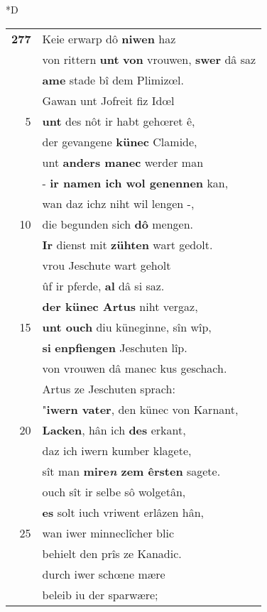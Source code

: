 \documentclass[8pt,a4paper,notitlepage]{article}
\begin{document}
\begin{table}[ht]
\begin{minipage}[t]{0.5\linewidth}
\small
\begin{center}*D
\end{center}
\begin{tabular}{rl}
\textbf{277} & Keie erwarp dô \textbf{niwen} haz\\ 
 & von rittern \textbf{unt} \textbf{von} vrouwen, \textbf{swer} dâ saz\\ 
 & \textbf{ame} stade bî dem Plimizœl.\\ 
 & Gawan unt Jofreit fiz Idœl\\ 
5 & \textbf{unt} des nôt ir habt gehœret ê,\\ 
 & der gevangene \textbf{künec} Clamide,\\ 
 & unt \textbf{anders manec} werder man\\ 
 & - \textbf{ir namen ich wol genennen} kan,\\ 
 & wan daz ichz niht wil lengen -,\\ 
10 & die begunden sich \textbf{dô} mengen.\\ 
 & \textbf{Ir} dienst mit \textbf{zühten} wart gedolt.\\ 
 & vrou Jeschute wart geholt\\ 
 & ûf ir pferde, \textbf{al} dâ si saz.\\ 
 & \textbf{der künec Artus} niht vergaz,\\ 
15 & \textbf{unt ouch} diu küneginne, sîn wîp,\\ 
 & \textbf{si} \textbf{enpfiengen} Jeschuten lîp.\\ 
 & von vrouwen dâ manec kus geschach.\\ 
 & Artus ze Jeschuten sprach:\\ 
 & "\textbf{iwern vater}, den künec von Karnant,\\ 
20 & \textbf{Lacken}, hân ich \textbf{des} erkant,\\ 
 & daz ich iwern kumber klagete,\\ 
 & sît man \textbf{mire\textit{n} zem êrsten} sagete.\\ 
 & ouch sît ir selbe sô wolgetân,\\ 
 & \textbf{es} solt iuch vriwent erlâzen hân,\\ 
25 & wan iwer minneclîcher blic\\ 
 & behielt den prîs ze Kanadic.\\ 
 & durch iwer schœne mære\\ 
 & beleib iu der sparwære;\\ 

\end{tabular}
\end{minipage}
\end{table}
\end{document}
